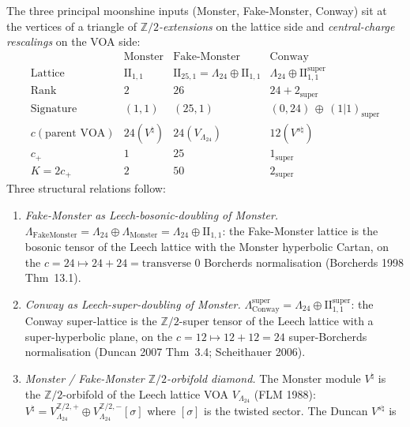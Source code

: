 \begin{remark}
\label{rem:bkm-conway-monster-fake-monster-triangle-bis}
The three principal moonshine inputs
(Monster, Fake-Monster, Conway)
sit at the vertices of a triangle of \emph{$\mathbb{Z}/2$-extensions}
on the lattice side and \emph{central-charge rescalings} on the VOA
side:
\[
\begin{array}{c|ccc}
 & \text{Monster} & \text{Fake-Monster} & \text{Conway} \\
\hline
\text{Lattice} & \mathrm{II}_{1,1} & \mathrm{II}_{25,1} = \Lambda_{24}\oplus\mathrm{II}_{1,1}
 & \Lambda_{24}\oplus\mathrm{II}_{1,1}^{\mathrm{super}} \\
\text{Rank} & 2 & 26 & 24 + 2_{\mathrm{super}} \\
\text{Signature} & (1,1) & (25,1) & (0,24)\,\oplus\,(1|1)_{\mathrm{super}} \\
c(\text{parent VOA}) & 24 (V^\natural) & 24 (V_{\Lambda_{24}}) & 12 (V^{s\natural}) \\
c_+ & 1 & 25 & 1_{\mathrm{super}} \\
K = 2c_+ & 2 & 50 & 2_{\mathrm{super}}
\end{array}
\]
Three structural relations follow:
\begin{enumerate}[label=\textup{(\roman*)}]
\item \emph{Fake-Monster as Leech-bosonic-doubling of Monster.}
$\Lambda_{\mathrm{FakeMonster}} = \Lambda_{24}\oplus\Lambda_{\mathrm{Monster}}
 = \Lambda_{24}\oplus\mathrm{II}_{1,1}$: the Fake-Monster lattice is the
bosonic tensor of the Leech lattice with the Monster hyperbolic Cartan,
on the $c = 24\mapsto 24 + 24 = \text{transverse }0$ Borcherds
normalisation (Borcherds 1998 Thm~13.1).
\item \emph{Conway as Leech-super-doubling of Monster.}
$\Lambda_{\mathrm{Conway}}^{\mathrm{super}} = \Lambda_{24}\oplus
 \mathrm{II}_{1,1}^{\mathrm{super}}$: the Conway super-lattice is
the $\mathbb{Z}/2$-super tensor of the Leech lattice with a
super-hyperbolic plane, on the $c = 12\mapsto 12 + 12 = 24$
super-Borcherds normalisation (Duncan 2007 Thm~3.4;
Scheithauer 2006).
\item \emph{Monster / Fake-Monster $\mathbb{Z}/2$-orbifold
diamond.} The Monster module
$V^\natural$ is the $\mathbb{Z}/2$-orbifold of the Leech lattice VOA
$V_{\Lambda_{24}}$ (FLM 1988): $V^\natural =
V_{\Lambda_{24}}^{\mathbb{Z}/2,+}\oplus V_{\Lambda_{24}}^{\mathbb{Z}/2,-}[\sigma]$
where $[\sigma]$ is the twisted sector. The Duncan $V^{s\natural}$ is

\end{enumerate}
\end{remark}
